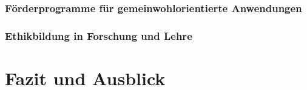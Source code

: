 \subsubsection{Förderprogramme für gemeinwohlorientierte Anwendungen}
\subsubsection{Ethikbildung in Forschung und Lehre}

\section{Fazit und Ausblick}
\paragraph{}







\printbibliography








